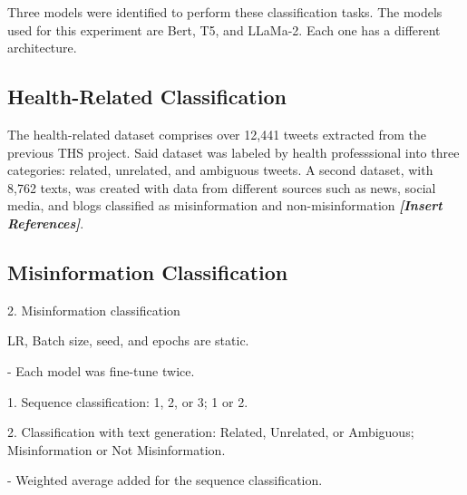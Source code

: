 Three models were identified to perform these classification tasks. The models used for this experiment are Bert, T5, and LLaMa-2. Each one has a different architecture. 


\subsection{Health-Related Classification}
The health-related dataset comprises over 12,441 tweets extracted from the previous THS project. Said dataset was labeled by health professsional into three categories: related, unrelated, and ambiguous tweets. A second dataset, with 8,762 texts, was created with data from different sources such as news, social media, and blogs classified as misinformation and non-misinformation \textbf{\textit{[Insert References]}}. 


\subsection{Misinformation Classification}



2. Misinformation classification

LR, Batch size, seed, and epochs are static.

- Each model was fine-tune twice.

    1. Sequence classification: 1, 2, or 3; 1 or 2.

    2. Classification with text generation: Related, Unrelated, or Ambiguous; Misinformation or Not Misinformation.

- Weighted average added for the sequence classification.

